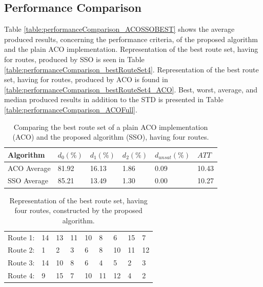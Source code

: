 \subsection{Performance Comparison}
\label{subsec:performanceComparison_results}


Table \vref{table:performanceComparison_ACOSSOBEST} shows the average produced results, concerning the performance criteria, of the proposed algorithm and the plain ACO implementation. Representation of the best route set, having for routes, produced by SSO is seen in Table \vref{table:performanceComparison_bestRouteSet4}.  Representation of the best route set, having for routes, produced by ACO is found in \vref{table:performanceComparison_bestRouteSet4_ACO}. Best, worst, average, and median produced results in addition to the STD is presented in Table \vref{table:performanceComparison_ACOFull}.

    \begin{table}[H]
    \centering
    \begin{tabular}{|l||l|l|l|l|l|}
    \hline
    Algorithm & $d_0(\%)$ & $d_1(\%)$ & $d_2(\%)$ & $d_{unsat}(\%)$ & $ATT$ \\
    \hline
    ACO Average & 81.92 & 16.13 & 1.86 & 0.09 & 10.43\\
    \hline
    SSO Average & 85.21 & 13.49 & 1.30 & 0.00 & 10.27\\
    \hline
    \end{tabular}
    \caption {Comparing the best route set of a plain ACO implementation (ACO) and the proposed algorithm (SSO), having four routes.}
    \label{table:performanceComparison_ACOSSOBEST}
    \end{table}

   


\begin{table}[H]
    \centering
    \begin{tabular}{|l|llllllll|}
    \hline
    Route 1: & 14 & 13 & 11 & 10 & 8 & 6 & 15 & 7 \\
    Route 2: & 1 & 2 & 3 & 6 & 8 & 10 & 11 & 12 \\
    Route 3: & 14 & 10 & 8 & 6 & 4 & 5 & 2 & 3 \\
    Route 4: & 9 & 15 & 7 & 10 & 11 & 12 & 4 & 2 \\
	\hline
    \end{tabular}
    \caption {Representation of the best route set, having four routes, constructed by the proposed algorithm.}
    \label{table:performanceComparison_bestRouteSet4}
\end{table}

